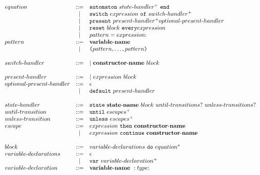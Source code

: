 \documentclass[a4paper]{article}
\newcommand{\Coloneqq}[0]{::=}
\begin{document}
\newcommand{\funo}{fun\sdash{}or\sdash{}node}

\[
\begin{array}{lcl}
  equation & \Coloneqq &
    \mathtt{automaton} \ state\sdash{}handler^+ \ \mathtt{end} \\
  & | & \mathtt{switch} \ expression \ \mathtt{of} \ switch\sdash{}handler^+ \\
  & | & \mathtt{present} \ present\sdash{}handler^+
    optional\sdash{}present\sdash{}handler \\
  & | & \mathtt{reset} \ block \ \mathtt{every} expression \\
  & | & pattern = expression; \\
  pattern & \Coloneqq & {\bf variable\sdash{}name} \\
  & | & \lp{}pattern,\dots,pattern\rp{} \\

  \\

  switch\sdash{}handler &
    \Coloneqq & | \ {\bf constructor\sdash{}name} \ block \\

  \\

  present\sdash{}handler & \Coloneqq &
    | \ expression \  block \\
  optional\sdash{}present\sdash{}handler & \Coloneqq & \epsilon \\
  & | & \mathtt{default} \ present\sdash{}handler \\

  \\
  state\sdash{}handler & \Coloneqq &
    \mathtt{state} \  {\bf state\sdash{}name} \ block
    \ until\sdash{}transitions? \  unless\sdash{}transitions? \\
  until\sdash{}transition & \Coloneqq & \mathtt{until} \ escapes^+ \\
  unless\sdash{}transition & \Coloneqq & \mathtt{unless} \ escapes^+ \\
  escape & \Coloneqq &
    expression \ \mathtt{then} \ {\bf constructor\sdash{}name} \\
    & | & expression \ \mathtt{continue} \ {\bf constructor\sdash{}name} \\

  \\

  block & \Coloneqq & variable\sdash{}declarations \ \mathtt{do} \ equation^* \\
  variable\sdash{}declarations & \Coloneqq & \epsilon \\
  & | & \mathtt{var} \ variable\sdash{}declaration^+ \\
  variable\sdash{}declaration & \Coloneqq & {\bf variable\sdash{}name} \ : type;
    \\


\end{array}\]
\end{document}
